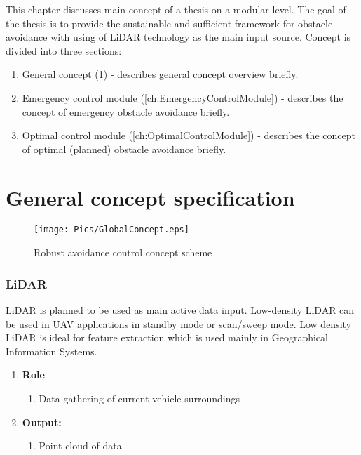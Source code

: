 
This chapter discusses main concept of a thesis on a modular level. 
The goal of the thesis is to provide the sustainable and sufficient framework for obstacle avoidance with using of LiDAR technology as the main input source.
Concept is divided into three sections:
\begin{enumerate}[1.]
    \item General concept (\ref{ch:ConceptSpecification}) - describes general concept overview briefly.
    \item Emergency control module (\ref{ch:EmergencyControlModule}) - describes the concept of emergency obstacle avoidance briefly.
    \item Optimal control module (\ref{ch:OptimalControlModule}) - describes the concept of optimal (planned) obstacle avoidance briefly.
\end{enumerate}

\section{General concept specification}\label{ch:ConceptSpecification}
\begin{figure}[h]
    \centering
    \texttt{[image: Pics/GlobalConcept.eps]}
    \caption{Robust avoidance control concept scheme}
    \label{fig:GlobalConcept}
\end{figure}

\subsubsection{LiDAR}
LiDAR is planned to be used as main active data input. Low-density LiDAR \cite{url:kickstarter:lidar} can be used in UAV applications 
in standby mode or scan/sweep mode.
Low density LiDAR is ideal for feature extraction which is used mainly in Geographical Information Systems.

\begin{enumerate}[]
	\item \textbf{Role}
	    \begin{enumerate}[]
		    \item Data gathering of current vehicle surroundings
		\end{enumerate}
	\item \textbf{Output:}
	    \begin{enumerate}[1.]
		\item Point cloud of data
		\end{enumerate}
\end{enumerate}


